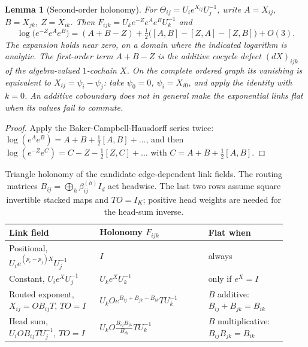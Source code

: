 \documentclass[11pt]{article}
\newtheorem{lemma}[theorem]{Lemma}
\theoremstyle{definition}
\theoremstyle{remark}
\begin{document}
\begin{lemma}[Second-order holonomy]
\label{links:curve:lem:bch}
For $\Theta_{ij}=U_ie^{X_{ij}}U_j^{-1}$, write $A=X_{ij}$, $B=X_{jk}$, $Z=X_{ik}$. Then $F_{ijk}=U_ke^{-Z}e^{A}e^{B}U_k^{-1}$ and
\begin{equation}
\log\big(e^{-Z}e^{A}e^{B}\big)=(A+B-Z)+\tfrac12\big([A,B]-[Z,A]-[Z,B]\big)+O(3).
\label{links:curve:eq:bch}
\end{equation}
The expansion holds near zero, on a domain where the indicated logarithm is analytic. The first-order term $A+B-Z$ is the additive cocycle defect $(dX)_{ijk}$ of the algebra-valued $1$-cochain $X$. On the complete ordered graph its vanishing is equivalent to $X_{ij}=\psi_i-\psi_j$: take $\psi_0=0$, $\psi_i=X_{i0}$, and apply the identity with $k=0$. An additive coboundary does not in general make the exponential links flat when its values fail to commute.
\end{lemma}

\begin{proof}
Apply the Baker-Campbell-Hausdorff series \cite{frame:Hall2015} twice: $\log(e^{A}e^{B})=A+B+\tfrac12[A,B]+\dots$, and then $\log(e^{-Z}e^{C})=C-Z-\tfrac12[Z,C]+\dots$ with $C=A+B+\tfrac12[A,B]$.
\end{proof}

\begin{table}[ht]
\centering
\small
\begin{tabular}{>{\raggedright}p{0.30\linewidth}>{\raggedright}p{0.36\linewidth}>{\raggedright\arraybackslash}p{0.26\linewidth}}
\toprule
Link field & Holonomy $F_{ijk}$ & Flat when \\
\midrule
Positional, $U_ie^{(p_i-p_j)X}U_j^{-1}$ & $I$ & always \\
Constant, $U_ie^{X}U_j^{-1}$ & $U_ke^{X}U_k^{-1}$ & only if $e^{X}=I$ \\
Routed exponent, $X_{ij}=OB_{ij}T$, $TO=I$ & $U_kOe^{B_{ij}+B_{jk}-B_{ik}}TU_k^{-1}$ & $B$ additive: $B_{ij}+B_{jk}=B_{ik}$ \\
Head sum, $U_iOB_{ij}TU_j^{-1}$, $TO=I$ & $U_kO\frac{B_{ij}B_{jk}}{B_{ik}}TU_k^{-1}$ & $B$ multiplicative: $B_{ij}B_{jk}=B_{ik}$ \\
\bottomrule
\end{tabular}
\caption{Triangle holonomy of the candidate edge-dependent link fields. The routing matrices $B_{ij}=\bigoplus_h\beta_{ij}^{(h)}I_d$ act headwise. The last two rows assume square invertible stacked maps and $TO=I_K$; positive head weights are needed for the head-sum inverse.}
\label{links:curve:tab:candidates}
\end{table}
\end{document}
